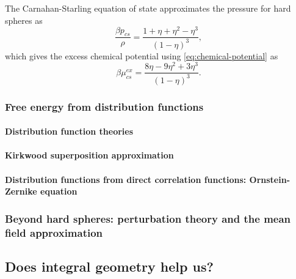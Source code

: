 The Carnahan-Starling equation of state approximates the pressure for hard spheres as \cite{Carnahan1969}
\begin{equation}\label{eq:cs-pressure}
  \frac{\beta p_{cs}}{\rho} = \frac{1 + \eta + \eta^2 - \eta^3}{(1-\eta)^3},
\end{equation}
which gives the excess chemical potential using \eqref{eq:chemical-potential} as
\begin{equation}\label{eq:cs-mu}
  \beta \mu_{cs}^{ex} = \frac{8\eta - 9\eta^2 + 3\eta^3}{(1-\eta)^3}.
\end{equation}

\subsubsection{Free energy from distribution functions}
\paragraph{Distribution function theories}
\paragraph{Kirkwood superposition approximation}
\paragraph{Distribution functions from direct correlation functions: Ornstein-Zernike equation}

\subsubsection{Beyond hard spheres: perturbation theory and the mean field approximation}

\subsection{Does integral geometry help us?}

